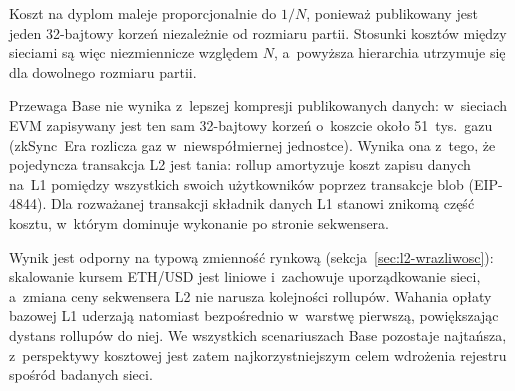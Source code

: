 Koszt na dyplom maleje proporcjonalnie do $1/N$, ponieważ publikowany jest jeden
32-bajtowy korzeń niezależnie od rozmiaru partii. Stosunki kosztów między sieciami
są więc niezmiennicze względem $N$, a~powyższa hierarchia utrzymuje się dla
dowolnego rozmiaru partii.

Przewaga Base nie wynika z~lepszej kompresji publikowanych danych: w~sieciach EVM
zapisywany jest ten sam 32-bajtowy korzeń o~koszcie około 51~tys.\ gazu (zkSync~Era
rozlicza gaz w~niewspółmiernej jednostce). Wynika ona z~tego, że pojedyncza
transakcja L2 jest tania: rollup amortyzuje koszt zapisu danych na~L1 pomiędzy
wszystkich swoich użytkowników poprzez transakcje blob (EIP-4844). Dla rozważanej
transakcji składnik danych L1 stanowi znikomą część kosztu, w~którym dominuje
wykonanie po stronie sekwensera.

Wynik jest odporny na typową zmienność rynkową
(sekcja~\ref{sec:l2-wrazliwosc}): skalowanie kursem ETH/USD jest liniowe
i~zachowuje uporządkowanie sieci, a~zmiana ceny sekwensera L2 nie narusza
kolejności rollupów. Wahania opłaty bazowej L1 uderzają natomiast bezpośrednio
w~warstwę pierwszą, powiększając dystans rollupów do niej. We wszystkich
scenariuszach Base pozostaje najtańsza, z~perspektywy kosztowej jest zatem
najkorzystniejszym celem wdrożenia rejestru spośród badanych sieci.
